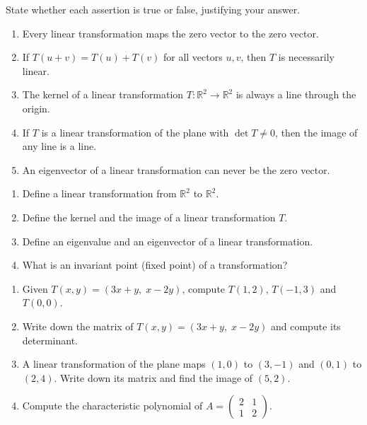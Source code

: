 \documentclass[11pt]{article}
\newcommand{\cle}[1]{{\popxbold\color{popdark}#1}}
\begin{document}
\begin{exercice}
State whether each assertion is true or false, justifying your answer.
\begin{enumerate}
\item Every linear transformation maps the zero vector to the zero vector.
\item If $T(u+v)=T(u)+T(v)$ for all vectors $u,v$, then $T$ is necessarily linear.
\item The kernel of a linear transformation $T:\mathbb{R}^{2}\to\mathbb{R}^{2}$ is always a line through the origin.
\item If $T$ is a linear transformation of the plane with $\det T\neq 0$, then the image of any line is a line.
\item An eigenvector of a linear transformation can never be the zero vector.
\end{enumerate}
\end{exercice}

\begin{exercice}
\begin{enumerate}
\item Define a \cle{linear transformation} from $\mathbb{R}^{2}$ to $\mathbb{R}^{2}$.
\item Define the \cle{kernel} and the \cle{image} of a linear transformation $T$.
\item Define an \cle{eigenvalue} and an \cle{eigenvector} of a linear transformation.
\item What is an \cle{invariant point} (fixed point) of a transformation?
\end{enumerate}
\end{exercice}

\begin{exercice}
\begin{enumerate}
\item Given $T(x,y)=(3x+y,\;x-2y)$, compute $T(1,2)$, $T(-1,3)$ and $T(0,0)$.
\item Write down the matrix of $T(x,y)=(3x+y,\;x-2y)$ and compute its determinant.
\item A linear transformation of the plane maps $(1,0)$ to $(3,-1)$ and $(0,1)$ to $(2,4)$. Write down its matrix and find the image of $(5,2)$.
\item Compute the characteristic polynomial of $A=\begin{pmatrix} 2 & 1 \\ 1 & 2 \end{pmatrix}$.
\end{enumerate}
\end{exercice}
\end{document}
